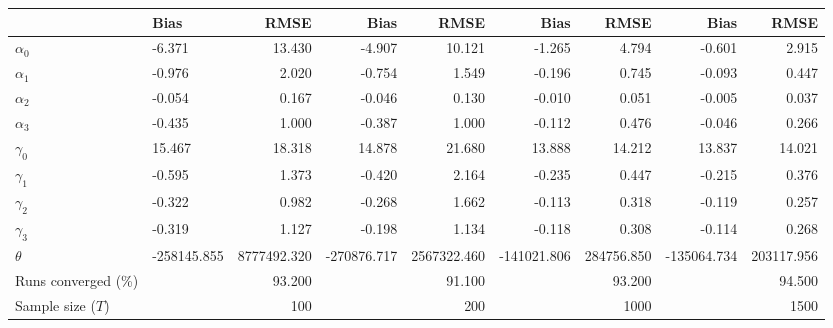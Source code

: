 
\begin{tabular}[t]{llrrrrrrr}
\toprule
  & Bias & RMSE & Bias & RMSE & Bias & RMSE & Bias & RMSE\\
\midrule
$\alpha_{0}$ & -6.371 & 13.430 & -4.907 & 10.121 & -1.265 & 4.794 & -0.601 & 2.915\\
$\alpha_{1}$ & -0.976 & 2.020 & -0.754 & 1.549 & -0.196 & 0.745 & -0.093 & 0.447\\
$\alpha_{2}$ & -0.054 & 0.167 & -0.046 & 0.130 & -0.010 & 0.051 & -0.005 & 0.037\\
$\alpha_{3}$ & -0.435 & 1.000 & -0.387 & 1.000 & -0.112 & 0.476 & -0.046 & 0.266\\
$\gamma_{0}$ & 15.467 & 18.318 & 14.878 & 21.680 & 13.888 & 14.212 & 13.837 & 14.021\\
$\gamma_{1}$ & -0.595 & 1.373 & -0.420 & 2.164 & -0.235 & 0.447 & -0.215 & 0.376\\
$\gamma_{2}$ & -0.322 & 0.982 & -0.268 & 1.662 & -0.113 & 0.318 & -0.119 & 0.257\\
$\gamma_{3}$ & -0.319 & 1.127 & -0.198 & 1.134 & -0.118 & 0.308 & -0.114 & 0.268\\
$\theta$ & -258145.855 & 8777492.320 & -270876.717 & 2567322.460 & -141021.806 & 284756.850 & -135064.734 & 203117.956\\
Runs converged (\%) &  & 93.200 &  & 91.100 &  & 93.200 &  & 94.500\\
Sample size ($T$) &  & 100 &  & 200 &  & 1000 &  & 1500\\
\bottomrule
\end{tabular}
